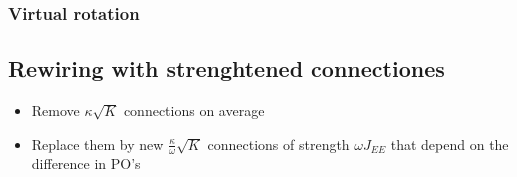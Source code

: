 \subsubsection{Virtual rotation}

\subsection{Rewiring with strenghtened connectiones}
\begin{itemize}
	\item Remove $\kappa \sqrt{K}$ connections on average
	\item Replace them by new $\frac{\kappa}{\omega} \sqrt{K}$ connections of strength $\omega J_{EE}$ that depend on the difference in PO's
\end{itemize}





